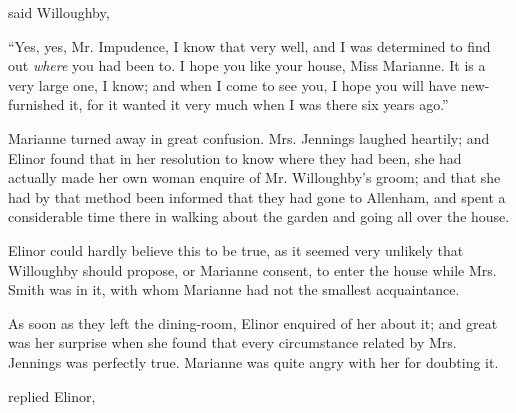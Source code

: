  said Willoughby, 

“Yes, yes, Mr. Impudence, I know that very well, and I was determined to find out {\em where} you had been to. I hope you like your house, Miss Marianne. It is a very large one, I know; and when I come to see you, I hope you will have new-furnished it, for it wanted it very much when I was there six years ago.”

Marianne turned away in great confusion. Mrs. Jennings laughed heartily; and Elinor found that in her resolution to know where they had been, she had actually made her own woman enquire of Mr. Willoughby's groom; and that she had by that method been informed that they had gone to Allenham, and spent a considerable time there in walking about the garden and going all over the house.

Elinor could hardly believe this to be true, as it seemed very unlikely that Willoughby should propose, or Marianne consent, to enter the house while Mrs. Smith was in it, with whom Marianne had not the smallest acquaintance.

As soon as they left the dining-room, Elinor enquired of her about it; and great was her surprise when she found that every circumstance related by Mrs. Jennings was perfectly true. Marianne was quite angry with her for doubting it.




 replied Elinor, 



